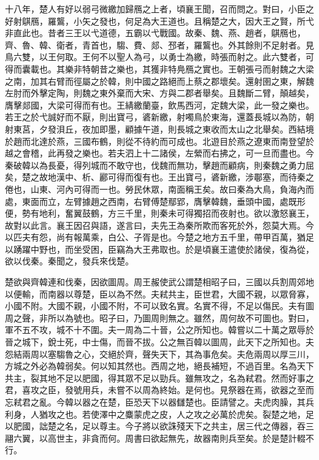 十八年，楚人有好以弱弓微繳加歸鴈之上者，頃襄王聞，召而問之。對曰，小臣之好射鶀鴈，羅鸗，小矢之發也，何足為大王道也。且稱楚之大，因大王之賢，所弋非直此也。昔者三王以弋道德，五霸以弋戰國。故秦、魏、燕、趙者，鶀鴈也，齊、魯、韓、衛者，青首也，騶、費、郯、邳者，羅鸗也。外其餘則不足射者。見鳥六雙，以王何取。王何不以聖人為弓，以勇士為繳，時張而射之。此六雙者，可得而囊載也。其樂非特朝昔之樂也，其獲非特鳧鴈之實也。王朝張弓而射魏之大梁之南，加其右臂而徑屬之於韓，則中國之路絕而上蔡之郡壞矣。還射圉之東，解魏左肘而外擊定陶，則魏之東外棄而大宋、方與二郡者舉矣。且魏斷二臂，顛越矣，膺擊郯國，大梁可得而有也。王綪繳蘭臺，飲馬西河，定魏大梁，此一發之樂也。若王之於弋誠好而不厭，則出寶弓，碆新繳，射噣鳥於東海，還蓋長城以為防，朝射東莒，夕發浿丘，夜加即墨，顧據午道，則長城之東收而太山之北舉矣。西結境於趙而北達於燕，三國布鶴，則從不待約而可成也。北遊目於燕之遼東而南登望於越之會稽，此再發之樂也。若夫泗上十二諸侯，左縈而右拂之，可一旦而盡也。今秦破韓以為長憂，得列城而不敢守也，伐魏而無功，擊趙而顧病，則秦魏之勇力屈矣，楚之故地漢中、析、酈可得而復有也。王出寶弓，碆新繳，涉鄳塞，而待秦之倦也，山東、河內可得而一也。勞民休眾，南面稱王矣。故曰秦為大鳥，負海內而處，東面而立，左臂據趙之西南，右臂傅楚鄢郢，膺擊韓魏，垂頭中國，處既形便，勢有地利，奮翼鼓鶴，方三千里，則秦未可得獨招而夜射也。欲以激怒襄王，故對以此言。襄王因召與語，遂言曰，夫先王為秦所欺而客死於外，怨莫大焉。今以匹夫有怨，尚有報萬乘，白公、子胥是也。今楚之地方五千里，帶甲百萬，猶足以踴躍中野也，而坐受困，臣竊為大王弗取也。於是頃襄王遣使於諸侯，復為從，欲以伐秦。秦聞之，發兵來伐楚。

楚欲與齊韓連和伐秦，因欲圖周。周王赧使武公謂楚相昭子曰，三國以兵割周郊地以便輸，而南器以尊楚，臣以為不然。夫弒共主，臣世君，大國不親，以眾脅寡，小國不附。大國不親，小國不附，不可以致名實。名實不得，不足以傷民。夫有圖周之聲，非所以為號也。昭子曰，乃圖周則無之。雖然，周何故不可圖也。對曰，軍不五不攻，城不十不圍。夫一周為二十晉，公之所知也。韓嘗以二十萬之眾辱於晉之城下，銳士死，中士傷，而晉不拔。公之無百韓以圖周，此天下之所知也。夫怨結兩周以塞騶魯之心，交絕於齊，聲失天下，其為事危矣。夫危兩周以厚三川，方城之外必為韓弱矣。何以知其然也。西周之地，絕長補短，不過百里。名為天下共主，裂其地不足以肥國，得其眾不足以勁兵。雖無攻之，名為弒君。然而好事之君，喜攻之臣，發號用兵，未嘗不以周為終始。是何也。見祭器在焉，欲器之至而忘弒君之亂。今韓以器之在楚，臣恐天下以器讎楚也。臣請譬之。夫虎肉臊，其兵利身，人猶攻之也。若使澤中之麋蒙虎之皮，人之攻之必萬於虎矣。裂楚之地，足以肥國，詘楚之名，足以尊主。今子將以欲誅殘天下之共主，居三代之傳器，吞三翮六翼，以高世主，非貪而何。周書曰欲起無先，故器南則兵至矣。於是楚計輟不行。

